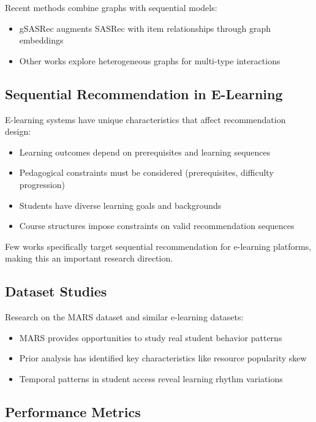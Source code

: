 Recent methods combine graphs with sequential models:

\begin{itemize}
    \item gSASRec augments SASRec with item relationships through graph embeddings
    \item Other works explore heterogeneous graphs for multi-type interactions
\end{itemize}

\subsection{Sequential Recommendation in E-Learning}

E-learning systems have unique characteristics that affect recommendation design:

\begin{itemize}
    \item Learning outcomes depend on prerequisites and learning sequences
    \item Pedagogical constraints must be considered (prerequisites, difficulty progression)
    \item Students have diverse learning goals and backgrounds
    \item Course structures impose constraints on valid recommendation sequences
\end{itemize}

Few works specifically target sequential recommendation for e-learning platforms, making this an important research direction.

\subsection{Dataset Studies}

Research on the MARS dataset and similar e-learning datasets:

\begin{itemize}
    \item MARS provides opportunities to study real student behavior patterns
    \item Prior analysis has identified key characteristics like resource popularity skew
    \item Temporal patterns in student access reveal learning rhythm variations
\end{itemize}

\subsection{Performance Metrics}

